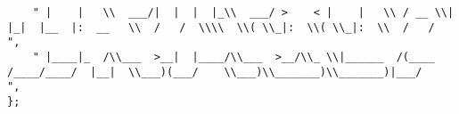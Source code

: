 \begin{lstlisting}
	" |    |   \\  ___/|  |  |  |_\\  ___/ >    < |    |   \\ / __ \\|  |_|  |__  |:  __   \\  /   /  \\\\  \\( \\_|:  \\( \\_|:  \\  /   /    ",
	" |____|_  /\\___  >__|  |____/\\___  >__/\\_ \\|______  /(____  /____/____/  |__|  \\___)(___/    \\___)\\_______)\\_______)|___/     ",
};


\end{lstlisting}
